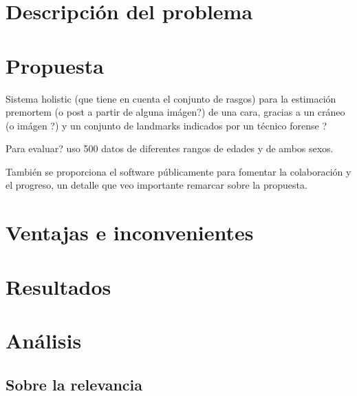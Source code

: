 \documentclass[13pt,a4paper]{article}
\begin{document}
    
    
    \tableofcontents
    \thispagestyle{empty}				%

    \newpage


\section{Descripción del problema}

\section{Propuesta}
Sistema holistic (que tiene en cuenta el conjunto de rasgos) para la estimación premortem (o post a partir de alguna imágen?) de una cara, gracias a un cráneo (o imágen ?) y un conjunto de landmarks indicados por un técnico forense ?

Para evaluar? uso 500 datos de diferentes rangos de edades y de ambos sexos.

También se proporciona el software públicamente para fomentar la colaboración y el progreso, un detalle que veo importante remarcar sobre la propuesta.

\section{Ventajas e inconvenientes}

\section{Resultados}

\section{Análisis}

\subsection{Sobre la relevancia}

\end{document}
